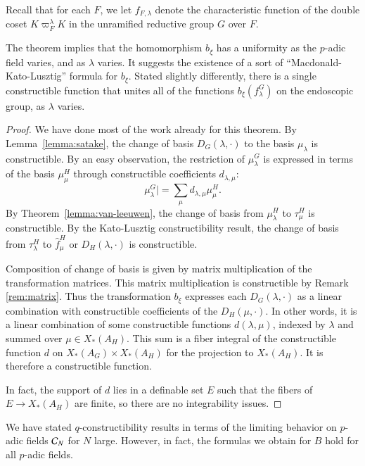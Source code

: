Recall that for each $F$, we let  $f_{F,\lambda}$ denote the characteristic function
of the double coset $K\varpi_F^\lambda K$ in the unramified reductive group $G$ over $F$.

The theorem implies that the homomorphism $b_\xi$ has a uniformity as the $p$-adic field
varies, and as $\lambda$ varies.  It suggests the existence of a sort of ``Macdonald-Kato-Lusztig''
formula for $b_\xi$.
Stated slightly differently, there is a single constructible function that unites
all of the functions $b_\xi (f^G_\lambda)$ on the endoscopic group, as $\lambda$ varies.

\begin{proof}
We have done most of the work already for this theorem.
By Lemma~\ref{lemma:satake}, the change of basis $D_G(\lambda,\cdot)$ to the basis $\mu_\lambda$
is constructible.  By an easy observation, the restriction of $\mu^G_\lambda$ is expressed in terms of the basis $\mu^H_\mu$ through
constructible coefficients $d_{\lambda,\mu}$:
\[
\mu^G_\lambda| = \sum_{\mu} d_{\lambda,\mu} \mu^H_\mu.
\]
By Theorem~\ref{lemma:van-leeuwen}, the change of basis from $\mu^H_\lambda$ to $\tau^H_\mu$ is constructible.
By the Kato-Lusztig constructibility result, the change of basis from 
$\tau^H_\lambda$ to $\hat f^H_\mu$ or $D_H(\lambda,\cdot)$ is constructible.  

Composition of change of basis is given by matrix multiplication of the transformation matrices.
This matrix multiplication is constructible by Remark \ref{rem:matrix}.  Thus the transformation $b_\xi$
expresses each $D_G(\lambda,\cdot)$ as a linear combination with constructible coefficients
of the $D_H(\mu,\cdot)$.   In other words, it is a linear combination of some constructible functions
$d(\lambda,\mu)$, indexed by $\lambda$ and summed over $\mu\in X_*(A_H)$.  This sum
is a fiber integral of the constructible function $d$ on $X_*(A_G)\times X_*(A_H)$ for the
projection to $X_*(A_H)$.  It is therefore a constructible function.

In fact, the support of $d$ lies in a definable set $E$ such that the fibers of $E\to X_*(A_H)$
are finite, so there are no integrability issues.
\end{proof}

\begin{remark}  We have stated $q$-constructibility results in terms of the limiting behavior on
$p$-adic fields $\mathcal C_N$ for $N$ large.  However, in fact, the formulas we obtain for $B$  hold for all
$p$-adic fields.
\end{remark}

